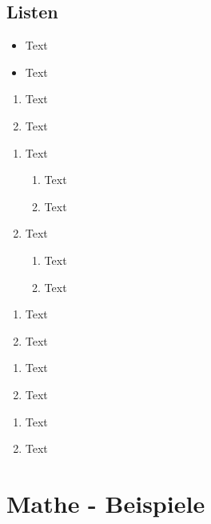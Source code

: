 \newpage %

\subsection{Listen}\label{sec:listen}

\begin{itemize}%
	\item Text
	\item Text
\end{itemize}

\begin{enumerate}%
	\item Text
	\item Text
\end{enumerate}

\begin{enumerate}%
	\item Text
	\begin{enumerate}%
		\item Text
		\item Text
	\end{enumerate}%
	\item Text
	\begin{enumerate}%
		\item Text
		\item Text
	\end{enumerate}
\end{enumerate}

\begin{enumerate}[label=(\roman*)]%
	\item Text
	\item Text
\end{enumerate}

\begin{enumerate}[label={\arabic*\alph*)}]%
	\item Text
	\item Text
\end{enumerate}

\begin{enumerate}[label=\bfseries Punkt \Roman*]%
	\item Text
	\item Text
\end{enumerate}

\section{Mathe - Beispiele}\label{mathe-bsp}

